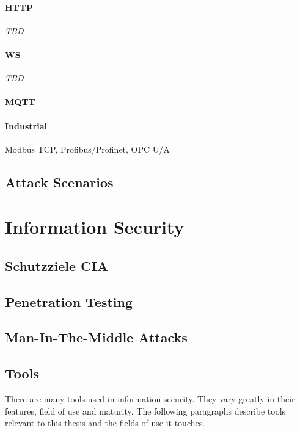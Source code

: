 \paragraph{\ac{HTTP}} \emph{TBD} %
\paragraph{\ac{WS}} \emph{TBD}
\paragraph{\ac{MQTT}}
\cite{gupta_banks_2015}

\paragraph{Industrial} Modbus \ac{TCP}, Profibus/Profinet, \ac{OPC U/A}
\subsection{Attack Scenarios}

\section{Information Security}
\label{sec:information-security}
\subsection{Schutzziele CIA}

\subsection{Penetration Testing}

\subsection{Man-In-The-Middle Attacks}

\subsection{Tools}
There are many tools used in information security. They vary greatly in their features, field of use and maturity. The following paragraphs describe tools relevant to this thesis and the fields of use it touches.

